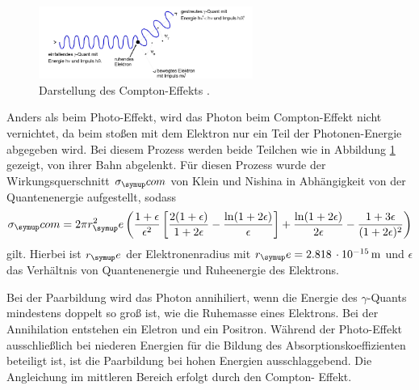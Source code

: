 \begin{figure}
  \includegraphics[width=7cm]{bilder/compton.jpg}
  \caption{Darstellung des Compton-Effekts \cite{704}.}
  \label{fig:com}
\end{figure}
Anders als beim Photo-Effekt, wird das Photon beim Compton-Effekt nicht vernichtet,
da beim stoßen mit dem Elektron nur ein Teil der Photonen-Energie abgegeben wird.
Bei diesem Prozess werden beide Teilchen wie in Abbildung \ref{fig:com} gezeigt,
von ihrer Bahn abgelenkt.
Für diesen Prozess wurde der Wirkungsquerschnitt $\sigma_\su{com}$ von Klein und
Nishina in Abhängigkeit von der Quantenenergie aufgestellt, sodass
\begin{equation}
  \sigma_\su{com}= 2\pi r^2_\su{e}\lf(\frac{1+\epsilon}{\epsilon^2}\lf[\frac{2(1+
  \epsilon)}{1+2\epsilon}-\frac{\ln(1+2\epsilon)}{\epsilon}\rt]+\frac{\ln(1+2\epsilon)}
  {2\epsilon}-\frac{1+3\epsilon}{(1+2\epsilon)^2}\rt)
\end{equation}
gilt. Hierbei ist $r_\su{e}$ der Elektronenradius mit $r_\su{e}=2.818\,\cdot10^
{-15}\mt$ \cite{rad} und $\epsilon$ das Verhältnis von Quantenenergie und Ruheenergie
des Elektrons.

Bei der Paarbildung wird das Photon annihiliert, wenn die Energie des $\gamma$-Quants
mindestens doppelt so groß ist, wie die Ruhemasse eines Elektrons. Bei der
Annihilation entstehen ein Eletron und ein Positron.
Während der Photo-Effekt ausschließlich bei niederen Energien für die Bildung des
Absorptionskoeffizienten beteiligt ist, ist die Paarbildung bei hohen Energien
ausschlaggebend. Die Angleichung im mittleren Bereich erfolgt durch den Compton-
Effekt.
